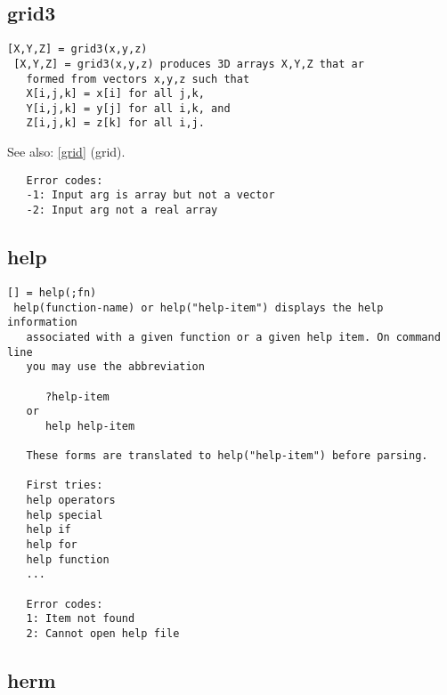 \documentclass[a4paper]{article}
\begin{document}
\subsection{grid3\label{grid3}}

\begin{tscreen}
\begin{verbatim}
[X,Y,Z] = grid3(x,y,z)
 [X,Y,Z] = grid3(x,y,z) produces 3D arrays X,Y,Z that ar
   formed from vectors x,y,z such that
   X[i,j,k] = x[i] for all j,k,
   Y[i,j,k] = y[j] for all i,k, and
   Z[i,j,k] = z[k] for all i,j.
\end{verbatim}

See also: \ref{grid} {(grid)}.
\begin{verbatim}
   Error codes:
   -1: Input arg is array but not a vector
   -2: Input arg not a real array 
\end{verbatim}
\end{tscreen}





\subsection{help\label{help}}

\begin{tscreen}
\begin{verbatim}
[] = help(;fn)
 help(function-name) or help("help-item") displays the help information
   associated with a given function or a given help item. On command line
   you may use the abbreviation

      ?help-item
   or
      help help-item

   These forms are translated to help("help-item") before parsing.

   First tries:
   help operators
   help special
   help if
   help for
   help function
   ...
   
   Error codes:
   1: Item not found
   2: Cannot open help file 
\end{verbatim}
\end{tscreen}





\subsection{herm\label{herm}}
\end{document}
